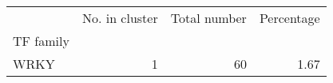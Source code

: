 \begin{tabular}{lrrr}
\toprule
{} &  No. in cluster &  Total number &  Percentage \\
TF family &                 &               &             \\
\midrule
WRKY      &               1 &            60 &        1.67 \\
\bottomrule
\end{tabular}
